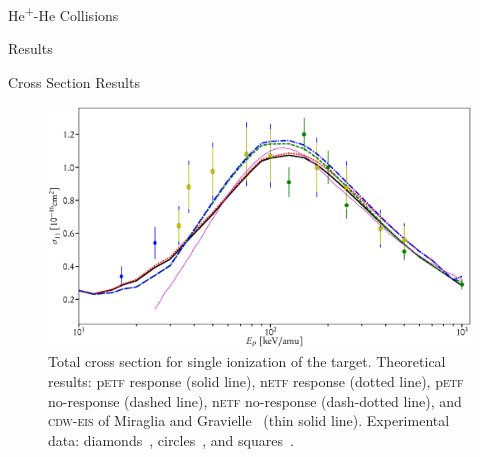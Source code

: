 \documentclass[a5paper, 9 pt]{extreport}
\begin{document}
\begin{chapter}{\texorpdfstring{He\textsuperscript{+}}{He+}-He Collisions \label{chap:hephe}}
\begin{section}{Results \label{sec:hephe-disc}}
\begin{subsection}{Cross Section Results \label{sec:hephe-res}}
         \begin{figure}[t]
            \centering
            \includegraphics[width = \linewidth]{./images/hephe-cross/HepHe-111.eps}
            \caption[Total cross section for single ionization of the target in He\textsuperscript{+}-He
                     collisions.]
                    {Total cross section for single ionization of the target.
                     Theoretical results: p\textsc{etf} response (solid line), n\textsc{etf} response
                                          (dotted line), p\textsc{etf} no-response (dashed line),
                                          n\textsc{etf} no-response (dash-dotted line), and
                                          \textsc{cdw-eis} of Miraglia and Gravielle~\cite{MG-10}
                                          (thin solid line).
                     Experimental data: diamonds~\cite{Dub-89}, circles~\cite{FTFHLP-95}, and
                                        squares~\cite{DT-88}.
                     \label{fig:cs111}}
         \end{figure}


\end{subsection}
\end{section}
\end{chapter}
\end{document}
